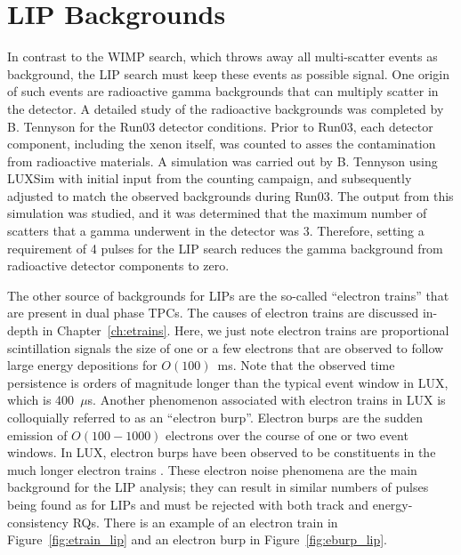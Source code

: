 \FloatBarrier
\section{LIP Backgrounds}
In contrast to the \ac{WIMP} search, which throws away all multi-scatter events as background, the \ac{LIP} search must keep these events as possible signal. One origin of such events are radioactive gamma backgrounds that can multiply scatter in the detector. A detailed study of the radioactive backgrounds was completed by B. Tennyson \cite{Tennyson2017} for the Run03 detector conditions. Prior to Run03, each detector component, including the xenon itself, was counted to asses the contamination from radioactive materials. A simulation was carried out by B. Tennyson using LUXSim with initial input from the counting campaign, and subsequently adjusted to match the observed backgrounds during Run03. The output from this simulation was studied, and it was determined that the maximum number of scatters that a gamma underwent in the detector was 3. Therefore, setting a requirement of 4 pulses for the \ac{LIP} search reduces the gamma background from radioactive detector components to zero. 

The other source of backgrounds for \ac{LIP}s are the so-called ``electron trains'' that are present in dual phase \ac{TPC}s. The causes of electron trains are discussed in-depth in Chapter~\ref{ch:etrains}. Here, we just note electron trains are proportional scintillation signals the size of one or a few electrons that are observed to follow large energy depositions for $O(100)$~ms. Note that the observed time persistence is orders of magnitude longer than the typical event window in \ac{LUX}, which is 400~$\mu$s. Another phenomenon associated with electron trains in \ac{LUX} is colloquially referred to as an ``electron burp''. Electron burps are the sudden emission of $O(100-1000)$ electrons over the course of one or two event windows. In \ac{LUX}, electron burps have been observed to be constituents in the much longer electron trains \cite{Xu2016}. These electron noise phenomena are the main background for the \ac{LIP} analysis; they can result in similar numbers of pulses being found as for \ac{LIP}s and must be rejected with both track and energy-consistency \ac{RQ}s. There is an example of an electron train in Figure~\ref{fig:etrain_lip} and an electron burp in Figure~\ref{fig:eburp_lip}. 

